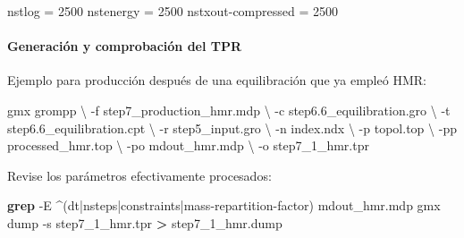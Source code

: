 \documentclass[
  spanish,
  11pt,
  a4paper]{article}
\newenvironment{Shaded}{\begin{snugshade}}{\end{snugshade}}
\newcommand{\AttributeTok}[1]{\textcolor[rgb]{0.13,0.29,0.53}{#1}}
\newcommand{\DataTypeTok}[1]{\textcolor[rgb]{0.13,0.29,0.53}{#1}}
\newcommand{\DecValTok}[1]{\textcolor[rgb]{0.00,0.00,0.81}{#1}}
\newcommand{\ExtensionTok}[1]{#1}
\newcommand{\FunctionTok}[1]{\textcolor[rgb]{0.13,0.29,0.53}{\textbf{#1}}}
\newcommand{\NormalTok}[1]{#1}
\newcommand{\OperatorTok}[1]{\textcolor[rgb]{0.81,0.36,0.00}{\textbf{#1}}}
\newcommand{\OtherTok}[1]{\textcolor[rgb]{0.56,0.35,0.01}{#1}}
\newcommand{\StringTok}[1]{\textcolor[rgb]{0.31,0.60,0.02}{#1}}
\begin{document}
\begin{Shaded}
\begin{Highlighting}[]
\DataTypeTok{nstlog              }\OtherTok{=}\StringTok{ }\DecValTok{2500}
\DataTypeTok{nstenergy           }\OtherTok{=}\StringTok{ }\DecValTok{2500}
\DataTypeTok{nstxout{-}compressed  }\OtherTok{=}\StringTok{ }\DecValTok{2500}
\end{Highlighting}
\end{Shaded}

\paragraph{Generación y comprobación del
TPR}\label{generaciuxf3n-y-comprobaciuxf3n-del-tpr}

Ejemplo para producción después de una equilibración que ya empleó HMR:

\begin{Shaded}
\begin{Highlighting}[]
\ExtensionTok{gmx}\NormalTok{ grompp }\DataTypeTok{\textbackslash{}}
    \AttributeTok{{-}f}\NormalTok{ step7\_production\_hmr.mdp }\DataTypeTok{\textbackslash{}}
    \AttributeTok{{-}c}\NormalTok{ step6.6\_equilibration.gro }\DataTypeTok{\textbackslash{}}
    \AttributeTok{{-}t}\NormalTok{ step6.6\_equilibration.cpt }\DataTypeTok{\textbackslash{}}
    \AttributeTok{{-}r}\NormalTok{ step5\_input.gro }\DataTypeTok{\textbackslash{}}
    \AttributeTok{{-}n}\NormalTok{ index.ndx }\DataTypeTok{\textbackslash{}}
    \AttributeTok{{-}p}\NormalTok{ topol.top }\DataTypeTok{\textbackslash{}}
    \AttributeTok{{-}pp}\NormalTok{ processed\_hmr.top }\DataTypeTok{\textbackslash{}}
    \AttributeTok{{-}po}\NormalTok{ mdout\_hmr.mdp }\DataTypeTok{\textbackslash{}}
    \AttributeTok{{-}o}\NormalTok{ step7\_1\_hmr.tpr}
\end{Highlighting}
\end{Shaded}

Revise los parámetros efectivamente procesados:

\begin{Shaded}
\begin{Highlighting}[]
\FunctionTok{grep} \AttributeTok{{-}E} \StringTok{\textquotesingle{}\^{}(dt|nsteps|constraints|mass{-}repartition{-}factor)\textquotesingle{}}\NormalTok{ mdout\_hmr.mdp}
\ExtensionTok{gmx}\NormalTok{ dump }\AttributeTok{{-}s}\NormalTok{ step7\_1\_hmr.tpr }\OperatorTok{\textgreater{}}\NormalTok{ step7\_1\_hmr.dump}
\end{Highlighting}
\end{Shaded}
\end{document}
